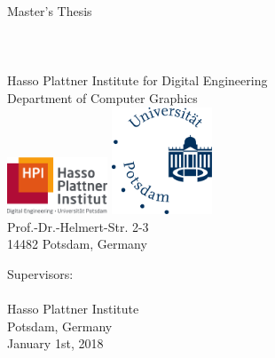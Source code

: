 \begin{titlepage}

\thispagestyle{empty}
\begin{center}
	\LARGE
	Master's Thesis\\
	\vspace{0.4cm}
	\Huge
    \TITLE{}\\
	\vspace{0.5cm}
	\LARGE
	\textbf{\AUTHOR}\\
	\normalsize
  \Mail{\EMAIL}\\
	\vspace{0.4cm}
	\small
	Hasso Plattner Institute for Digital Engineering\\
	Department of Computer Graphics\\
	\vspace{0.4cm}
	\includegraphics[width=3cm]{figures/hpi_logo}
	\hspace{1cm}
	\includegraphics[width=3cm]{figures/Universitaet_Potsdam_logo}\\
	\vspace{0.4cm}
	Prof.-Dr.-Helmert-Str. 2-3\\
	14482 Potsdam, Germany\\
\end{center}
Supervisors:
\vspace{0.4cm}\\
\SUPERVISOR
\vspace{0.4cm}\\
Hasso Plattner Institute\\
Potsdam, Germany\\
January 1st, 2018
\end{titlepage}
